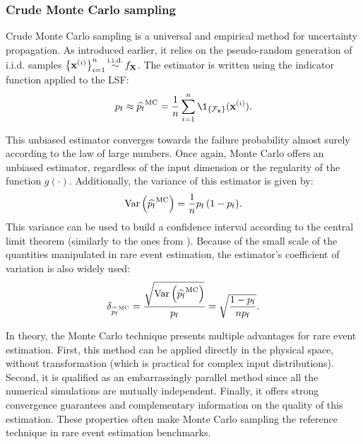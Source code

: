\subsubsection{Crude Monte Carlo sampling}
Crude Monte Carlo sampling is a universal and empirical method for uncertainty propagation. 
As introduced earlier, it relies on the pseudo-random generation of i.i.d. samples $\left\{{\bf x}^{(i)}\right\}_{i=1}^n \mathop{\sim}\limits^{\mathrm{i.i.d.}} f_{\bf X}$.   
The estimator is written using the indicator function applied to the LSF: 
\begin{equation}
    \pf \approx \what{\pf}^{\textrm{MC}} = \frac1n \sum_{i=1}^{n} \1_{\{\iF_\bx\}}(\bx^{(i)}).
\end{equation} 

This unbiased estimator converges towards the failure probability almost surely according to the law of large numbers. 
Once again, Monte Carlo offers an unbiased estimator, regardless of the input dimension or the regularity of the function $g(\cdot)$.   
Additionally, the variance of this estimator is given by:
\begin{equation}
    \operatorname{Var}\left(\widehat{p_\mathrm{f}}^{\textrm{MC}}\right) = \frac1n p_\mathrm{f} \, (1 - p_\mathrm{f}).
\end{equation} 
This variance can be used to build a confidence interval according to the central limit theorem (similarly to the ones from ). 
Because of the small scale of the quantities manipulated in rare event estimation, the estimator's coefficient of variation is also widely used: 
\begin{equation}
    \delta_{\widehat{p_\mathrm{f}}^{\textrm{MC}}} = \frac{\sqrt{\operatorname{Var}\left(\widehat{p_\mathrm{f}}^{\textrm{MC}}\right)}}{p_\mathrm{f}}
                                      = \sqrt{\frac{1 - p_\mathrm{f}}{n p_\mathrm{f}}}.
\end{equation}

In theory, the Monte Carlo technique presents multiple advantages for rare event estimation. 
First, this method can be applied directly in the physical space, without transformation (which is practical for complex input distributions). 
Second, it is qualified as an embarrassingly parallel method since all the numerical simulations are mutually independent. 
Finally, it offers strong convergence guarantees and complementary information on the quality of this estimation. 
These properties often make Monte Carlo sampling the reference technique in rare event estimation benchmarks. 

